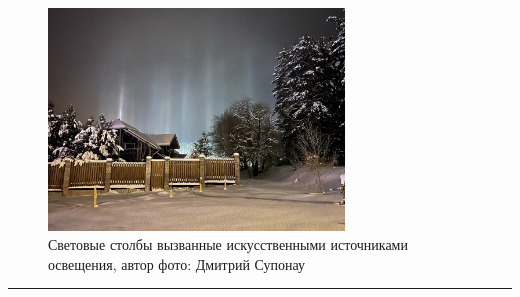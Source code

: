 \documentclass[a4paper,12pt]{article} %
\begin{document}
\begin{figure}
\centering
\includegraphics[width=0.7\textwidth]{light_ray.jpg}
\caption{\centering Световые столбы вызванные искусственными источниками освещения, автор фото: Дмитрий Супонау}
\label{fig:pillar2}
\end{figure}
\medskip\hrule\medskip
\end{document}
